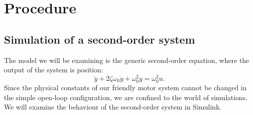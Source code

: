 \section{Procedure}

\subsection{Simulation of a second-order system}\label{subsec:simulation}

The model we will be examining is the generic second-order equation, where
the output of the system is position:
\begin{equation}\label{eq:sys}
\ddot y +2\zeta\omega_{0}\dot y+\omega_{0}^{2}y = \omega_{0}^{2}u.
\end{equation}
Since the physical constants of our friendly motor system cannot be changed
in the simple open-loop configuration, we are confined to the world of
simulations.  We will examine the behaviour of the second-order system in
\textsf{Simulink}.
